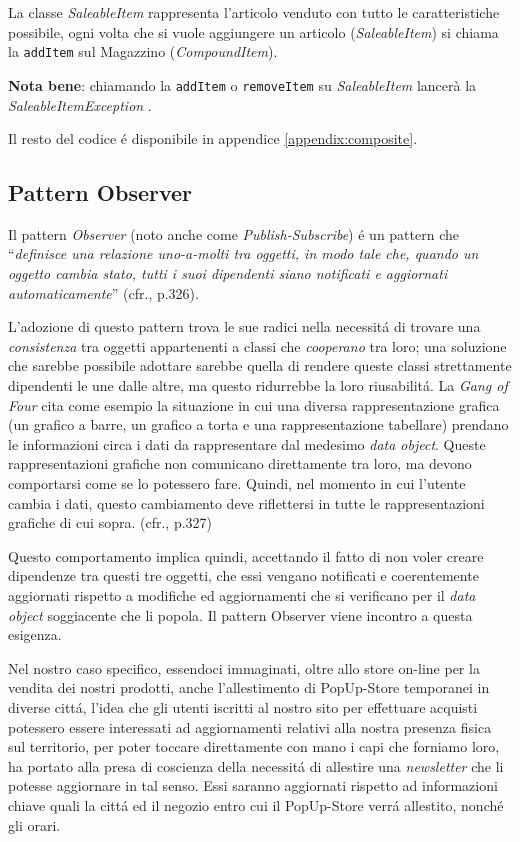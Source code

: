 \documentclass[12pt]{article}
\begin{document}
La classe \textit{SaleableItem} rappresenta l'articolo venduto con tutto le caratteristiche possibile, ogni volta che si vuole aggiungere un articolo (\textit{SaleableItem}) si chiama la {\tt addItem} sul Magazzino (\textit{CompoundItem}).

\textbf{Nota bene}: chiamando la {\tt addItem} o {\tt removeItem} su \textit{SaleableItem} lancerà la \textit{SaleableItemException} \cite{gof_riferimento}.

Il resto del codice \'e disponibile in appendice \ref{appendix:composite}.


\subsection{Pattern Observer}

Il pattern \textit{Observer} (noto anche come \textit{Publish-Subscribe}) \'e un pattern che ``\textit{definisce una relazione uno-a-molti tra oggetti, in modo tale che, quando un oggetto cambia stato, tutti i suoi dipendenti siano notificati e aggiornati automaticamente}'' (cfr.\cite{gof_riferimento}, p.326). 

L'adozione di questo pattern trova le sue radici nella necessit\'a di trovare una \textit{consistenza} tra oggetti appartenenti a classi che \textit{cooperano} tra loro; una soluzione che sarebbe possibile adottare sarebbe quella di rendere queste classi strettamente dipendenti le une dalle altre, ma questo ridurrebbe la loro riusabilit\'a. La \textit{Gang of Four} cita come esempio la situazione in cui una diversa rappresentazione grafica (un grafico a barre, un grafico a torta e una rappresentazione tabellare) prendano le informazioni circa i dati da rappresentare dal medesimo \textit{data object}. Queste rappresentazioni grafiche non comunicano direttamente tra loro, ma devono comportarsi come se lo potessero fare. Quindi, nel momento in cui l'utente cambia i dati, questo cambiamento deve riflettersi in tutte le rappresentazioni grafiche di cui sopra. (cfr.\cite{gof_riferimento}, p.327)

Questo comportamento implica quindi, accettando il fatto di non voler creare dipendenze tra questi tre oggetti, che essi vengano notificati e coerentemente aggiornati rispetto a modifiche ed aggiornamenti che si verificano per il \textit{data object} soggiacente che li popola. Il pattern Observer viene incontro a questa esigenza. 

Nel nostro caso specifico, essendoci immaginati, oltre allo store on-line per la vendita dei nostri prodotti, anche l'allestimento di PopUp-Store temporanei in diverse citt\'a, l'idea che gli utenti iscritti al nostro sito per effettuare acquisti potessero essere interessati ad aggiornamenti relativi alla nostra presenza fisica sul territorio, per poter toccare direttamente con mano i capi che forniamo loro, ha portato alla presa di coscienza della necessit\'a di allestire una \textit{newsletter} che li potesse aggiornare in tal senso. Essi saranno aggiornati rispetto ad informazioni chiave quali la citt\'a ed il negozio entro cui il PopUp-Store verr\'a allestito, nonch\'e gli orari. 
\end{document}
